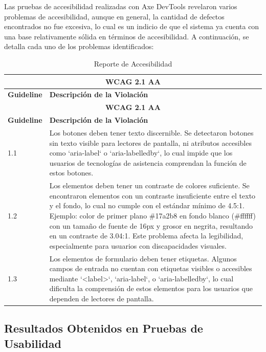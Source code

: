 \documentclass[stu, 12pt, letterpaper, donotrepeattitle, floatsintext, natbib]{apa7}
\begin{document}
\noindent Las pruebas de accesibilidad realizadas con Axe DevTools revelaron varios problemas de accesibilidad, aunque en general, la cantidad de defectos encontrados no fue excesiva, lo cual es un indicio de que el sistema ya cuenta con una base relativamente sólida en términos de accesibilidad. A continuación, se detalla cada uno de los problemas identificados:

\begin{longtable}{|p{3cm}|p{10cm}|}
    \caption{Reporte de Accesibilidad} \label{tab:reporte_accesibilidad} \\
    \hline
    \multicolumn{2}{|c|}{\textbf{WCAG 2.1 AA}} \\ \hline
    \textbf{Guideline} & \textbf{Descripción de la Violación} \\ \hline
    \endfirsthead

    \hline
    \multicolumn{2}{|c|}{\textbf{WCAG 2.1 AA}} \\ \hline
    \textbf{Guideline} & \textbf{Descripción de la Violación} \\ \hline
    \endhead

    1.1 & Los botones deben tener texto discernible. Se detectaron botones sin texto visible para lectores de pantalla, ni atributos accesibles como `aria-label` o `aria-labelledby`, lo cual impide que los usuarios de tecnologías de asistencia comprendan la función de estos botones. \\ \hline
    1.2 & Los elementos deben tener un contraste de colores suficiente. Se encontraron elementos con un contraste insuficiente entre el texto y el fondo, lo cual no cumple con el estándar mínimo de 4.5:1. Ejemplo: color de primer plano \#17a2b8 en fondo blanco (\#ffffff) con un tamaño de fuente de 16px y grosor en negrita, resultando en un contraste de 3.04:1. Este problema afecta la legibilidad, especialmente para usuarios con discapacidades visuales. \\ \hline
    1.3 & Los elementos de formulario deben tener etiquetas. Algunos campos de entrada no cuentan con etiquetas visibles o accesibles mediante `<label>`, `aria-label`, o `aria-labelledby`, lo cual dificulta la comprensión de estos elementos para los usuarios que dependen de lectores de pantalla. \\ \hline
\end{longtable}

\subsection{Resultados Obtenidos en Pruebas de Usabilidad}
\end{document}
